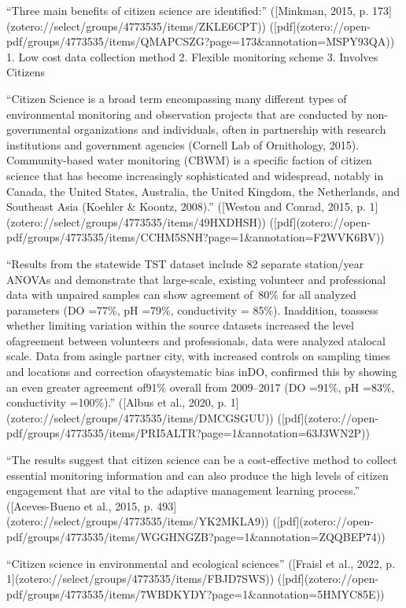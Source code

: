 {“Three main benefits of citizen science are identified:” ([Minkman, 2015, p. 173](zotero://select/groups/4773535/items/ZKLE6CPT)) ([pdf](zotero://open-pdf/groups/4773535/items/QMAPCSZG?page=173&annotation=MSPY93QA))
1. Low cost data collection method
2. Flexible monitoring scheme
3. Involves Citizens


“Citizen Science is a broad term encompassing many different types of environmental monitoring and observation projects that are conducted by non-governmental organizations and individuals, often in partnership with research institutions and government agencies (Cornell Lab of Ornithology, 2015). Community-based water monitoring (CBWM) is a specific faction of citizen science that has become increasingly sophisticated and widespread, notably in Canada, the United States, Australia, the United Kingdom, the Netherlands, and Southeast Asia (Koehler & Koontz, 2008).” ([Weston and Conrad, 2015, p. 1](zotero://select/groups/4773535/items/49HXDHSH)) ([pdf](zotero://open-pdf/groups/4773535/items/CCHM5SNH?page=1&annotation=F2WVK6BV))

“Results from the statewide TST dataset include 82 separate station/year ANOVAs and demonstrate that large-scale, existing volunteer and professional data with unpaired samples can show agreement of~80\% for all analyzed parameters (DO =77\%, pH =79\%, conductivity = 85\%). Inaddition, toassess whether limiting variation within the source datasets increased the level ofagreement between volunteers and professionals, data were analyzed atalocal scale. Data from asingle partner city, with increased controls on sampling times and locations and correction ofasystematic bias inDO, confirmed this by showing an even greater agreement of91\% overall from 2009–2017 (DO =91\%, pH =83\%, conductivity =100\%).” ([Albus et al., 2020, p. 1](zotero://select/groups/4773535/items/DMCGSGUU)) ([pdf](zotero://open-pdf/groups/4773535/items/PRI5ALTR?page=1\&annotation=63J3WN2P))

“The results suggest that citizen science can be a cost-effective method to collect essential monitoring information and can also produce the high levels of citizen engagement that are vital to the adaptive management learning process.” ([Aceves-Bueno et al., 2015, p. 493](zotero://select/groups/4773535/items/YK2MKLA9)) ([pdf](zotero://open-pdf/groups/4773535/items/WGGHNGZB?page=1&annotation=ZQQBEP74))

“Citizen science in environmental and ecological sciences” ([Fraisl et al., 2022, p. 1](zotero://select/groups/4773535/items/FBJD7SWS)) ([pdf](zotero://open-pdf/groups/4773535/items/7WBDKYDY?page=1&annotation=5HMYC85E))
}
